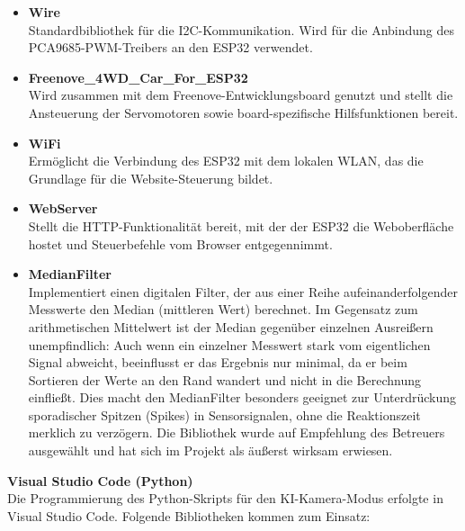 \documentclass[12pt,a4paper]{article}
\begin{document}
\vspace{0.5em}
\begin{itemize}[itemsep=4pt]
    \item \textbf{Wire} \\
    Standardbibliothek für die I2C-Kommunikation. Wird für die Anbindung des 
    PCA9685-PWM-Treibers an den ESP32 verwendet.

    \item \textbf{Freenove\_4WD\_Car\_For\_ESP32} \\
    Wird zusammen mit dem Freenove-Entwicklungsboard genutzt und stellt die 
    Ansteuerung der Servomotoren sowie board-spezifische Hilfsfunktionen bereit.

    \item \textbf{WiFi} \\
    Ermöglicht die Verbindung des ESP32 mit dem lokalen WLAN, das die Grundlage 
    für die Website-Steuerung bildet.

    \item \textbf{WebServer} \\
    Stellt die HTTP-Funktionalität bereit, mit der der ESP32 die Weboberfläche 
    hostet und Steuerbefehle vom Browser entgegennimmt.

    \item \textbf{MedianFilter} \\
    Implementiert einen digitalen Filter, der aus einer Reihe aufeinanderfolgender 
    Messwerte den Median (mittleren Wert) berechnet. Im Gegensatz zum arithmetischen 
    Mittelwert ist der Median gegenüber einzelnen Ausreißern unempfindlich: Auch wenn 
    ein einzelner Messwert stark vom eigentlichen Signal abweicht, beeinflusst er das 
    Ergebnis nur minimal, da er beim Sortieren der Werte an den Rand wandert und nicht 
    in die Berechnung einfließt. Dies macht den MedianFilter besonders geeignet zur 
    Unterdrückung sporadischer Spitzen (Spikes) in Sensorsignalen, ohne die 
    Reaktionszeit merklich zu verzögern. Die Bibliothek wurde auf Empfehlung des 
    Betreuers ausgewählt und hat sich im Projekt als äußerst wirksam erwiesen.
\end{itemize}

\textbf{Visual Studio Code (Python)} \\
Die Programmierung des Python-Skripts für den KI-Kamera-Modus erfolgte in 
Visual Studio Code. Folgende Bibliotheken kommen zum Einsatz:
\end{document}
